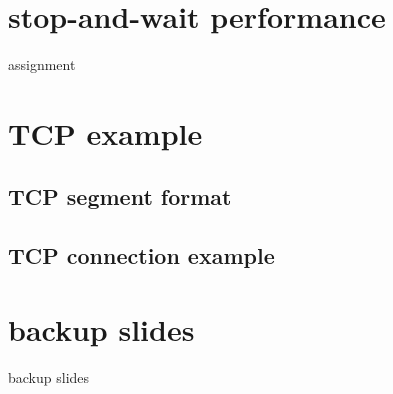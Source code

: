 \section{stop-and-wait performance}


\begin{frame}{assignment}
\end{frame}



\section{TCP example}

\subsection{TCP segment format}


%

\subsection{TCP connection example}




\section{backup slides}
\begin{frame}{backup slides}
\end{frame}


